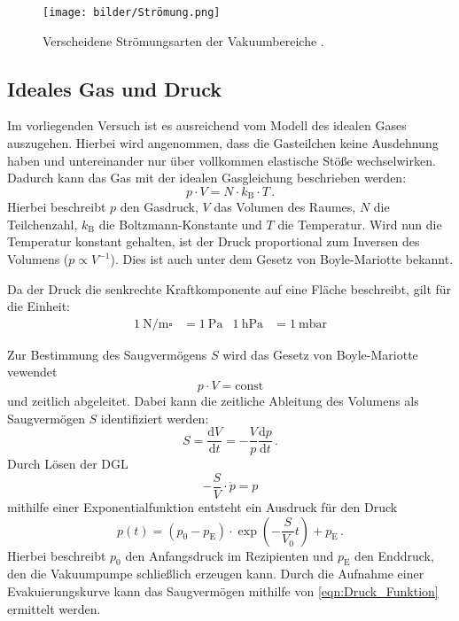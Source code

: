        \begin{figure}
            \centering
            \texttt{[image: bilder/Strömung.png]}
            \caption{Verscheidene Strömungsarten der Vakuumbereiche \cite{Pfeiffer}.}
            \label{fig:Strömung}
        \end{figure}

    \subsection{Ideales Gas und Druck}
        Im vorliegenden Versuch ist es ausreichend vom Modell des idealen Gases auszugehen.
        Hierbei wird angenommen, dass die Gasteilchen keine Ausdehnung haben und untereinander nur über vollkommen elastische Stöße wechselwirken.
        Dadurch kann das Gas mit der idealen Gasgleichung beschrieben werden:
        \begin{equation*}
            p \cdot V = N \cdot k_\text{B} \cdot T \, .
        \end{equation*}
        Hierbei beschreibt $p$ den Gasdruck, $V$ das Volumen des Raumes, $N$ die Teilchenzahl, $k_\text{B}$ die Boltzmann-Konstante und $T$ die Temperatur.
        Wird nun die Temperatur konstant gehalten, ist der Druck proportional zum Inversen des Volumens ($p \propto V^{-1}$).
        Dies ist auch unter dem Gesetz von Boyle-Mariotte bekannt.

        \noindent
        Da der Druck die senkrechte Kraftkomponente auf eine Fläche beschreibt, gilt für die Einheit:
        \begin{align*}
            \SI{1}{\newton\per\metre\square} &= \SI{1}{\pascal}& \SI{1}{\hecto\pascal} &= \SI{1}{\milli\bar} 
        \end{align*}

        \noindent
        Zur Bestimmung des Saugvermögens $S$ wird das Gesetz von Boyle-Mariotte vewendet
        \begin{equation*}
            p \cdot V = \text{const}
        \end{equation*}
        und zeitlich abgeleitet.
        Dabei kann die zeitliche Ableitung des Volumens als Saugvermögen $S$ identifiziert werden:
        \begin{equation*}
            S = \frac{\text{d}V}{\text{d}t} = - \frac{V}{p} \frac{\text{d}p}{\text{d}t} \, .
        \end{equation*}
        Durch Lösen der DGL
        \begin{equation}
            - \frac{S}{V} \cdot \dot{p} = p
            \label{eqn:saug_eva_theo}
        \end{equation}
        mithilfe einer Exponentialfunktion entsteht ein Ausdruck für den Druck
        \begin{equation}
            p(t) = (p_0 - p_\text{E}) \cdot \exp{(- \frac{S}{V_0}t)} +p_\text{E} \, .
            \label{eqn:Druck_Funktion}
        \end{equation}
        Hierbei beschreibt $p_0$ den Anfangsdruck im Rezipienten und $p_\text{E}$ den Enddruck, den die Vakuumpumpe schließlich erzeugen kann.
        Durch die Aufnahme einer Evakuierungskurve kann das Saugvermögen mithilfe von \eqref{eqn:Druck_Funktion} ermittelt werden.

